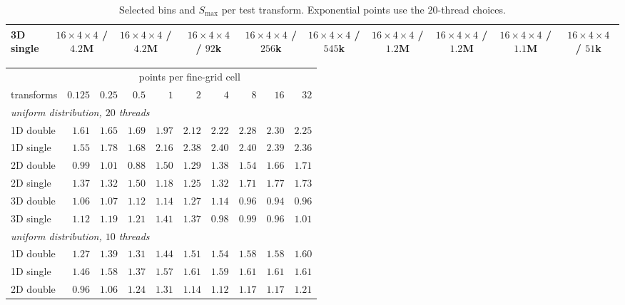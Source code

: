 \begin{table}[p]
{\begin{tabular}{lccccccccc}
        3D single & $16{\times}4{\times}4$ / $4.2$M & $16{\times}4{\times}4$ / $4.2$M & $16{\times}4{\times}4$ / $92$k & $16{\times}4{\times}4$ / $256$k & $16{\times}4{\times}4$ / $545$k & $16{\times}4{\times}4$ / $1.2$M & $16{\times}4{\times}4$ / $1.2$M & $16{\times}4{\times}4$ / $1.1$M & $16{\times}4{\times}4$ / $51$k \\
        \bottomrule
    \end{tabular}}
    \caption{Selected bins and $S_{\max}$ per test transform. Exponential points use the $20$-thread choices.}
    \label{tab:app_selection_picks}
\end{table}

\begin{table}[p]
    \centering
    \footnotesize
    \setlength{\tabcolsep}{4pt}
    \begin{tabular}{lrrrrrrrrr}
        \toprule
        & \multicolumn{9}{c}{points per fine-grid cell} \\
        \cmidrule(lr){2-10}
        transforms & $0.125$ & $0.25$ & $0.5$ & $1$ & $2$ & $4$ & $8$ & $16$ & $32$ \\
        \midrule
        \multicolumn{10}{l}{\emph{uniform distribution, $20$ threads}} \\
        1D double & $1.61$ & $1.65$ & $1.69$ & $1.97$ & $2.12$ & $2.22$ & $2.28$ & $2.30$ & $2.25$ \\
        1D single & $1.55$ & $1.78$ & $1.68$ & $2.16$ & $2.38$ & $2.40$ & $2.40$ & $2.39$ & $2.36$ \\
        2D double & $0.99$ & $1.01$ & $0.88$ & $1.50$ & $1.29$ & $1.38$ & $1.54$ & $1.66$ & $1.71$ \\
        2D single & $1.37$ & $1.32$ & $1.50$ & $1.18$ & $1.25$ & $1.32$ & $1.71$ & $1.77$ & $1.73$ \\
        3D double & $1.06$ & $1.07$ & $1.12$ & $1.14$ & $1.27$ & $1.14$ & $0.96$ & $0.94$ & $0.96$ \\
        3D single & $1.12$ & $1.19$ & $1.21$ & $1.41$ & $1.37$ & $0.98$ & $0.99$ & $0.96$ & $1.01$ \\
        \midrule
        \multicolumn{10}{l}{\emph{uniform distribution, $10$ threads}} \\
        1D double & $1.27$ & $1.39$ & $1.31$ & $1.44$ & $1.51$ & $1.54$ & $1.58$ & $1.58$ & $1.60$ \\
        1D single & $1.46$ & $1.58$ & $1.37$ & $1.57$ & $1.61$ & $1.59$ & $1.61$ & $1.61$ & $1.61$ \\
        2D double & $0.96$ & $1.06$ & $1.24$ & $1.31$ & $1.14$ & $1.12$ & $1.17$ & $1.17$ & $1.21$ \\

\end{tabular}
\end{table}
